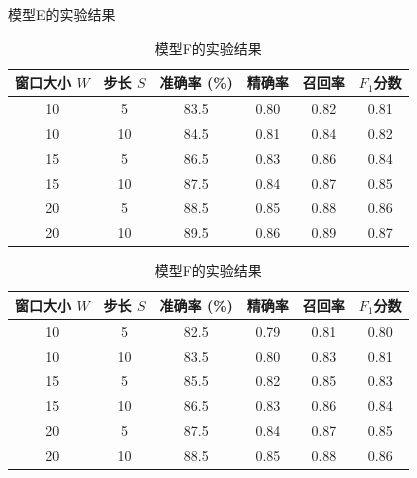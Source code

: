 \begin{table}[htbp]
    \begin{subtable}{\linewidth}
        \centering
        \caption{模型E的实验结果}
        \begin{tabular}{cc|cccc}
            \toprule
            窗口大小 $W$ & 步长 $S$ & 准确率 (\%) & 精确率 & 召回率 & $F_1$分数 \\
            \midrule
            10 & 5 & 83.5 & 0.80 & 0.82 & 0.81 \\
            10 & 10 & 84.5 & 0.81 & 0.84 & 0.82 \\
            15 & 5 & 86.5 & 0.83 & 0.86 & 0.84 \\
            15 & 10 & 87.5 & 0.84 & 0.87 & 0.85 \\
            20 & 5 & 88.5 & 0.85 & 0.88 & 0.86 \\
            20 & 10 & 89.5 & 0.86 & 0.89 & 0.87 \\
            \bottomrule
        \end{tabular}
        \label{tab:modelE_performance}
    \end{subtable}

    \vspace{0.4cm}

    \begin{subtable}{\linewidth}
        \centering
        \caption{模型F的实验结果}
        \begin{tabular}{cc|cccc}
            \toprule
            窗口大小 $W$ & 步长 $S$ & 准确率 (\%) & 精确率 & 召回率 & $F_1$分数 \\
            \midrule
            10 & 5 & 82.5 & 0.79 & 0.81 & 0.80 \\
            10 & 10 & 83.5 & 0.80 & 0.83 & 0.81 \\
            15 & 5 & 85.5 & 0.82 & 0.85 & 0.83 \\
            15 & 10 & 86.5 & 0.83 & 0.86 & 0.84 \\
            20 & 5 & 87.5 & 0.84 & 0.87 & 0.85 \\
            20 & 10 & 88.5 & 0.85 & 0.88 & 0.86 \\
            \bottomrule
        \end{tabular}
        \label{tab:modelF_performance}
    \end{subtable}
\end{table}
 
